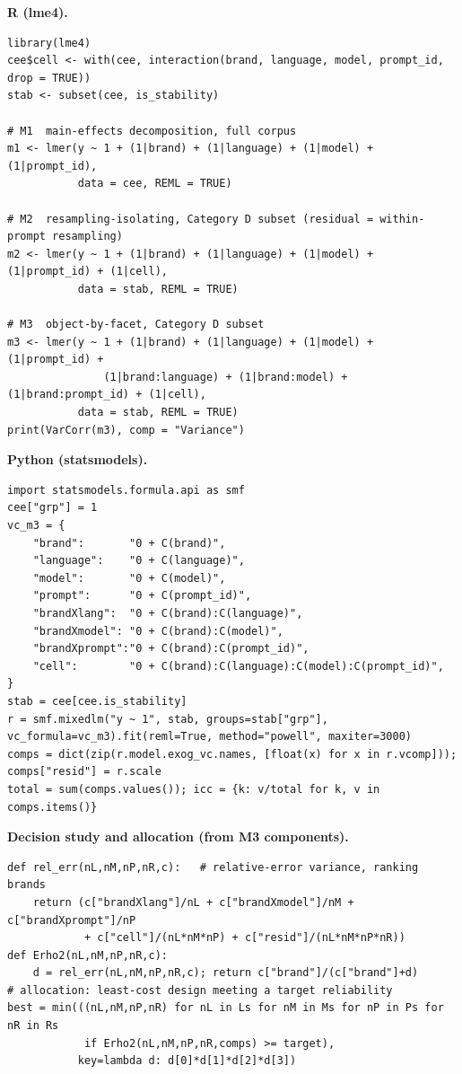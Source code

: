 \documentclass[pdflatex,sn-mathphys-num]{sn-jnl}
\begin{document}
\textbf{R (lme4).}

\begin{lstlisting}
library(lme4)
cee$cell <- with(cee, interaction(brand, language, model, prompt_id, drop = TRUE))
stab <- subset(cee, is_stability)

# M1  main-effects decomposition, full corpus
m1 <- lmer(y ~ 1 + (1|brand) + (1|language) + (1|model) + (1|prompt_id),
           data = cee, REML = TRUE)

# M2  resampling-isolating, Category D subset (residual = within-prompt resampling)
m2 <- lmer(y ~ 1 + (1|brand) + (1|language) + (1|model) + (1|prompt_id) + (1|cell),
           data = stab, REML = TRUE)

# M3  object-by-facet, Category D subset
m3 <- lmer(y ~ 1 + (1|brand) + (1|language) + (1|model) + (1|prompt_id) +
               (1|brand:language) + (1|brand:model) + (1|brand:prompt_id) + (1|cell),
           data = stab, REML = TRUE)
print(VarCorr(m3), comp = "Variance")
\end{lstlisting}

\textbf{Python (statsmodels).}

\begin{lstlisting}
import statsmodels.formula.api as smf
cee["grp"] = 1
vc_m3 = {
    "brand":       "0 + C(brand)",
    "language":    "0 + C(language)",
    "model":       "0 + C(model)",
    "prompt":      "0 + C(prompt_id)",
    "brandXlang":  "0 + C(brand):C(language)",
    "brandXmodel": "0 + C(brand):C(model)",
    "brandXprompt":"0 + C(brand):C(prompt_id)",
    "cell":        "0 + C(brand):C(language):C(model):C(prompt_id)",
}
stab = cee[cee.is_stability]
r = smf.mixedlm("y ~ 1", stab, groups=stab["grp"], vc_formula=vc_m3).fit(reml=True, method="powell", maxiter=3000)
comps = dict(zip(r.model.exog_vc.names, [float(x) for x in r.vcomp])); comps["resid"] = r.scale
total = sum(comps.values()); icc = {k: v/total for k, v in comps.items()}
\end{lstlisting}

\textbf{Decision study and allocation (from M3 components).}

\begin{lstlisting}
def rel_err(nL,nM,nP,nR,c):   # relative-error variance, ranking brands
    return (c["brandXlang"]/nL + c["brandXmodel"]/nM + c["brandXprompt"]/nP
            + c["cell"]/(nL*nM*nP) + c["resid"]/(nL*nM*nP*nR))
def Erho2(nL,nM,nP,nR,c):
    d = rel_err(nL,nM,nP,nR,c); return c["brand"]/(c["brand"]+d)
# allocation: least-cost design meeting a target reliability
best = min(((nL,nM,nP,nR) for nL in Ls for nM in Ms for nP in Ps for nR in Rs
            if Erho2(nL,nM,nP,nR,comps) >= target),
           key=lambda d: d[0]*d[1]*d[2]*d[3])
\end{lstlisting}
\end{document}
